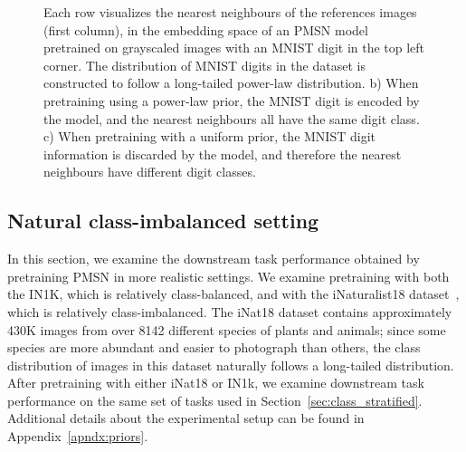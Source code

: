 \documentclass{article} %
\begin{document}
\begin{figure}[t]
\begin{subfigure}{0.45\textwidth}
    \end{subfigure}
    \caption{Each row visualizes the nearest neighbours of the references images (first column), in the embedding space of an PMSN model
    pretrained on grayscaled images with an MNIST digit in the top left corner. 
    The distribution of MNIST digits in the dataset is constructed to follow a long-tailed power-law distribution.
    b) When pretraining using a power-law prior, the MNIST digit is encoded by the model, and the nearest neighbours all have the same digit class.
    c) When pretraining with a uniform prior, the MNIST digit information is discarded by the model, and therefore the nearest neighbours have different digit classes.}
    \label{fig:cifar10-nn}
\end{figure}

\subsection{Natural class-imbalanced setting}

In this section, we examine the downstream task performance obtained by pretraining PMSN in more realistic settings.
We examine pretraining with both the IN1K, which is relatively class-balanced, and with the iNaturalist18 dataset~\citep{van2018inaturalist}, which is relatively class-imbalanced.
The iNat18 dataset contains approximately 430K images from over 8142 different species of plants and animals; since some species are more abundant and easier to photograph than others, the class distribution of images in this dataset naturally follows a long-tailed distribution. %
After pretraining with either iNat18 or IN1k, we examine downstream task performance on the same set of tasks used in Section~\ref{sec:class_stratified}.
Additional details about the experimental setup can be found in Appendix~\ref{apndx:priors}.
\end{document}

